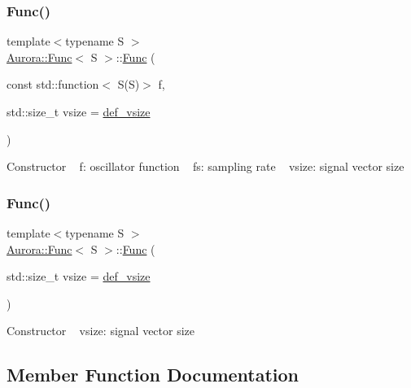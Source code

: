 \subsubsection{\texorpdfstring{Func()}{Func()}\hspace{0.1cm}{\footnotesize\ttfamily [1/2]}}
{\footnotesize\ttfamily template$<$typename S $>$ \\
\hyperlink{class_aurora_1_1_func}{Aurora\+::\+Func}$<$ S $>$\+::\hyperlink{class_aurora_1_1_func}{Func} (\begin{DoxyParamCaption}\item[{const std\+::function$<$ S(S)$>$}]{f,  }\item[{std\+::size\+\_\+t}]{vsize = {\ttfamily \hyperlink{namespace_aurora_afaaddf667a06e7ce23c667a8b7295263}{def\+\_\+vsize}} }\end{DoxyParamCaption})\hspace{0.3cm}{\ttfamily [inline]}}

Constructor ~\newline
f\+: oscillator function ~\newline
fs\+: sampling rate ~\newline
vsize\+: signal vector size \mbox{\label{class_aurora_1_1_func_a43642517fd146a27c689f570ddd46c1e}} 
\subsubsection{\texorpdfstring{Func()}{Func()}\hspace{0.1cm}{\footnotesize\ttfamily [2/2]}}
{\footnotesize\ttfamily template$<$typename S $>$ \\
\hyperlink{class_aurora_1_1_func}{Aurora\+::\+Func}$<$ S $>$\+::\hyperlink{class_aurora_1_1_func}{Func} (\begin{DoxyParamCaption}\item[{std\+::size\+\_\+t}]{vsize = {\ttfamily \hyperlink{namespace_aurora_afaaddf667a06e7ce23c667a8b7295263}{def\+\_\+vsize}} }\end{DoxyParamCaption})\hspace{0.3cm}{\ttfamily [inline]}}

Constructor ~\newline
vsize\+: signal vector size 

\subsection{Member Function Documentation}
\mbox{\label{class_aurora_1_1_func_ad0b316fc635de73ddcd75f97293c10d9}} 
